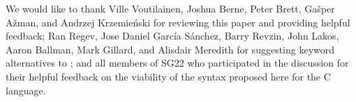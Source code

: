 We would like to thank Ville Voutilainen, Joshua Berne, Peter Brett, Ga\v sper A\v zman, and Andrzej Krzemie\' nski for reviewing this paper and providing helpful feedback; Ran Regev, Jose Daniel Garc\' ia S\' anchez, Barry Revzin, John Lakos, Aaron Ballman, Mark Gillard, and Alisdair Meredith for suggesting keyword alternatives to ; and all members of SG22 who participated in the discussion for their helpful feedback on the viability of the syntax proposed here for the C language.

\renewcommand{\addcontentsline}[3]{}%







